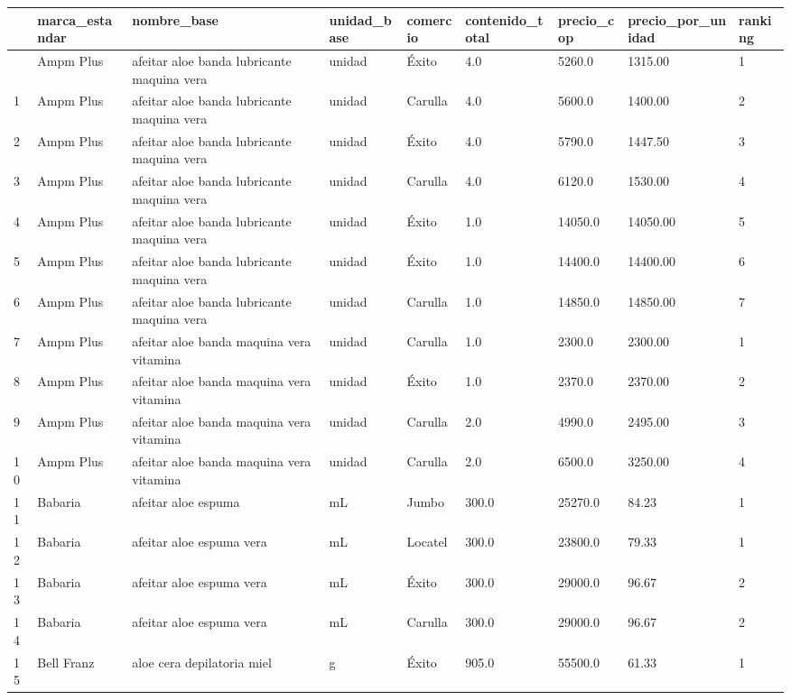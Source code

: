\documentclass[
  spanish,
  letterpaper,
  DIV=11,
  numbers=noendperiod]{scrartcl}
\newcounter{none} %
\begin{document}
{\def\LTcaptype{none} %
\begin{longtable}[]{@{}lllllllll@{}}
\toprule\noalign{}
& marca\_estandar & nombre\_base & unidad\_base & comercio &
contenido\_total & precio\_cop & precio\_por\_unidad & ranking \\
\midrule\noalign{}
\endhead
\bottomrule\noalign{}
\endlastfoot
0 & Ampm Plus & afeitar aloe banda lubricante maquina vera & unidad &
Éxito & 4.0 & 5260.0 & 1315.00 & 1 \\
1 & Ampm Plus & afeitar aloe banda lubricante maquina vera & unidad &
Carulla & 4.0 & 5600.0 & 1400.00 & 2 \\
2 & Ampm Plus & afeitar aloe banda lubricante maquina vera & unidad &
Éxito & 4.0 & 5790.0 & 1447.50 & 3 \\
3 & Ampm Plus & afeitar aloe banda lubricante maquina vera & unidad &
Carulla & 4.0 & 6120.0 & 1530.00 & 4 \\
4 & Ampm Plus & afeitar aloe banda lubricante maquina vera & unidad &
Éxito & 1.0 & 14050.0 & 14050.00 & 5 \\
5 & Ampm Plus & afeitar aloe banda lubricante maquina vera & unidad &
Éxito & 1.0 & 14400.0 & 14400.00 & 6 \\
6 & Ampm Plus & afeitar aloe banda lubricante maquina vera & unidad &
Carulla & 1.0 & 14850.0 & 14850.00 & 7 \\
7 & Ampm Plus & afeitar aloe banda maquina vera vitamina & unidad &
Carulla & 1.0 & 2300.0 & 2300.00 & 1 \\
8 & Ampm Plus & afeitar aloe banda maquina vera vitamina & unidad &
Éxito & 1.0 & 2370.0 & 2370.00 & 2 \\
9 & Ampm Plus & afeitar aloe banda maquina vera vitamina & unidad &
Carulla & 2.0 & 4990.0 & 2495.00 & 3 \\
10 & Ampm Plus & afeitar aloe banda maquina vera vitamina & unidad &
Carulla & 2.0 & 6500.0 & 3250.00 & 4 \\
11 & Babaria & afeitar aloe espuma & mL & Jumbo & 300.0 & 25270.0 &
84.23 & 1 \\
12 & Babaria & afeitar aloe espuma vera & mL & Locatel & 300.0 & 23800.0
& 79.33 & 1 \\
13 & Babaria & afeitar aloe espuma vera & mL & Éxito & 300.0 & 29000.0 &
96.67 & 2 \\
14 & Babaria & afeitar aloe espuma vera & mL & Carulla & 300.0 & 29000.0
& 96.67 & 2 \\
15 & Bell Franz & aloe cera depilatoria miel & g & Éxito & 905.0 &
55500.0 & 61.33 & 1 \\

\end{longtable}}
\end{document}
